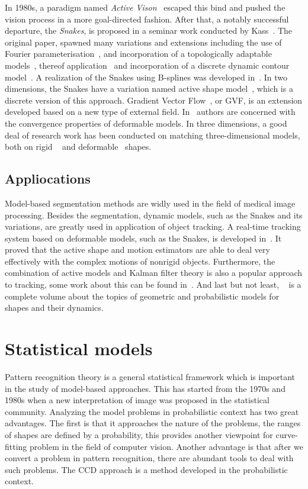 In 1980s, a paradigm named \textit{Active Vison}~\cite{aloimonos1988active} escaped this bind and
pushed the vision process in a more goal-directed fashion. After that, a
notably successful departure, the \textit{Snakes}, is proposed in a
seminar work conducted by Kass~\cite{kass1988snakes}. The original paper, spawned many variations
and extensions including the use of Fourier
parameterisation~\cite{scott1987alternative}, and incorporation
of a topologically adaptable models~\cite{mcinerney1995topologically},
thereof application~\cite{mcinemey1999topology} and incorporation of a discrete
dynamic contour model~\cite{lobregt1995discrete}. A realization of the
Snakes using B-splines was developed in~\cite{brigger2000b}. In two
dimensions, the Snakes have a variation named active shape
model~\cite{cootes1995active}, which is a discrete version of this
approach. Gradient Vector Flow~\cite{xu1998snakes}, or GVF, is an extension developed
based on a new type of external field. In~\cite{xu2000gradient}
authors are concerned with the convergence properties of deformable
models. In three dimensions, a good deal of research work has been
conducted on matching three-dimensional models, both on rigid
~\cite{harris1993tracking} and deformable~\cite{terzopoulos1991dynamic} shapes.
\subsection{Appliocations}
\label{sec:app}
Model-based segmentation methods are widly used in the field of
medical image processing. Besides the segmentation,
dynamic models, such as the Snakes and its variations, are greatly used in application of object
tracking. A real-time tracking system based on deformable models, such
as the Snakes, is developed
in~\cite{terzopoulos1992tracking}. It proved that the active shape and
motion estimators are able to deal very effectively with the complex
motions of nonrigid objects. Furthermore, the combination of active
models and Kalman filter theory is also a popular approach to
tracking, some work about this can be found
in~\cite{schick1991simultaneous}. And last but not least,
~\cite{blake1998active} is a complete volume about the topics of
geometric and probabilistic models  for shapes and their dynamics.

\section{Statistical models}
\label{sec:sm}
Pattern recognition theory is a general statistical framework which is
important in the study of model-based approaches. This has started from the 1970s
and 1980s when a new interpretation of image was proposed in the
statistical community.  Analyzing the model problems in probabilistic
context has two great advantages. The first is that it approaches the
nature of the problems, the ranges of shapes are defined by a
probability, this provides another viewpoint for curve-fitting problem
in the field of computer vision. Another advantage is that after we
convert a problem in pattern recognition, there are abundant tools to deal with such problems. 
The CCD approach is a method developed in the probabilistic context. 

